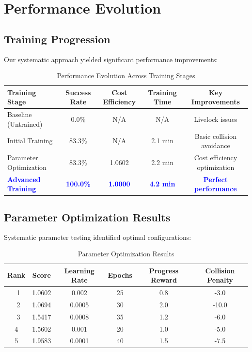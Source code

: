 \documentclass[12pt, a4paper]{report}
\newcommand{\highlight}[1]{\textcolor{blue}{\textbf{#1}}}
\begin{document}
\section{Performance Evolution}

\subsection{Training Progression}
Our systematic approach yielded significant performance improvements:

\begin{table}[H]
\centering
\caption{Performance Evolution Across Training Stages}
\begin{tabular}{|l|c|c|c|c|}
\hline
\textbf{Training Stage} & \textbf{Success Rate} & \textbf{Cost Efficiency} & \textbf{Training Time} & \textbf{Key Improvements} \\
\hline
Baseline (Untrained) & 0.0\% & N/A & N/A & Livelock issues \\
Initial Training & 83.3\% & N/A & 2.1 min & Basic collision avoidance \\
Parameter Optimization & 83.3\% & 1.0602 & 2.2 min & Cost efficiency optimization \\
\highlight{Advanced Training} & \highlight{100.0\%} & \highlight{1.0000} & \highlight{4.2 min} & \highlight{Perfect performance} \\
\hline
\end{tabular}
\end{table}

\subsection{Parameter Optimization Results}
Systematic parameter testing identified optimal configurations:

\begin{table}[H]
\centering
\caption{Parameter Optimization Results}
\begin{tabular}{|c|c|c|c|c|c|}
\hline
\textbf{Rank} & \textbf{Score} & \textbf{Learning Rate} & \textbf{Epochs} & \textbf{Progress Reward} & \textbf{Collision Penalty} \\
\hline
🥇 1 & 1.0602 & 0.002 & 25 & 0.8 & -3.0 \\
🥈 2 & 1.0694 & 0.0005 & 30 & 2.0 & -10.0 \\
🥉 3 & 1.5417 & 0.0008 & 35 & 1.2 & -6.0 \\
4 & 1.5602 & 0.001 & 20 & 1.0 & -5.0 \\
5 & 1.9583 & 0.0001 & 40 & 1.5 & -7.5 \\
\hline
\end{tabular}
\end{table}
\end{document}
